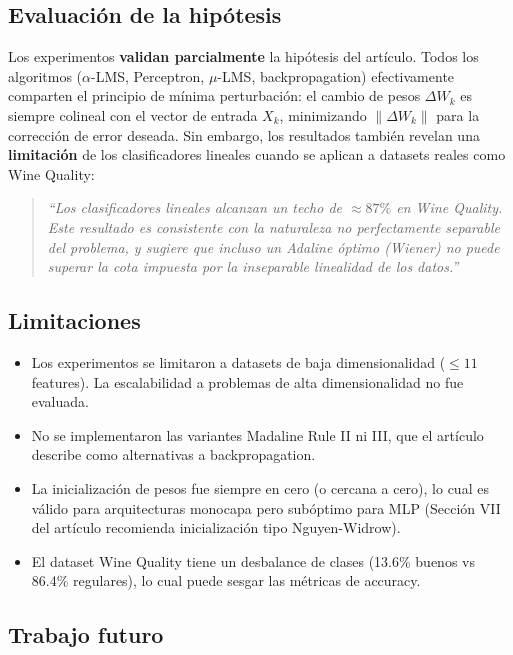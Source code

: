 \documentclass[12pt,a4paper]{article}
\newcommand{\norm}[1]{\lVert#1\rVert}
\begin{document}
\subsection{Evaluación de la hipótesis}

Los experimentos \textbf{validan parcialmente} la hipótesis del artículo. Todos los algoritmos ($\alpha$-LMS, Perceptron, $\mu$-LMS, backpropagation) efectivamente comparten el principio de mínima perturbación: el cambio de pesos $\Delta W_k$ es siempre colineal con el vector de entrada $X_k$, minimizando $\norm{\Delta W_k}$ para la corrección de error deseada. Sin embargo, los resultados también revelan una \textbf{limitación} de los clasificadores lineales cuando se aplican a datasets reales como Wine Quality:

\begin{quote}
\textit{``Los clasificadores lineales alcanzan un techo de $\approx 87\%$ en Wine Quality. Este resultado es consistente con la naturaleza no perfectamente separable del problema, y sugiere que incluso un Adaline óptimo (Wiener) no puede superar la cota impuesta por la inseparable linealidad de los datos.''}
\end{quote}

\subsection{Limitaciones}

\begin{itemize}[leftmargin=*]
    \item Los experimentos se limitaron a datasets de baja dimensionalidad ($\leq 11$ features). La escalabilidad a problemas de alta dimensionalidad no fue evaluada.
    \item No se implementaron las variantes Madaline Rule II ni III, que el artículo describe como alternativas a backpropagation.
    \item La inicialización de pesos fue siempre en cero (o cercana a cero), lo cual es válido para arquitecturas monocapa pero subóptimo para MLP (Sección VII del artículo recomienda inicialización tipo Nguyen-Widrow).
    \item El dataset Wine Quality tiene un desbalance de clases (13.6\% buenos vs 86.4\% regulares), lo cual puede sesgar las métricas de accuracy.
\end{itemize}

\subsection{Trabajo futuro}
\end{document}
